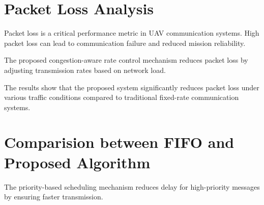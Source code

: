 \section{Packet Loss Analysis}

Packet loss is a critical performance metric 
in UAV communication systems. High packet loss 
can lead to communication failure and reduced 
mission reliability.

The proposed congestion-aware rate control 
mechanism reduces packet loss by adjusting 
transmission rates based on network load.

\begin{table}[H]
\centering
\caption{Packet Loss Comparison}
\end{table}

The results show that the proposed system 
significantly reduces packet loss under 
various traffic conditions compared to 
traditional fixed-rate communication systems.



\section{Comparision between FIFO and Proposed Algorithm}

The priority-based scheduling mechanism 
reduces delay for high-priority messages 
by ensuring faster transmission.

